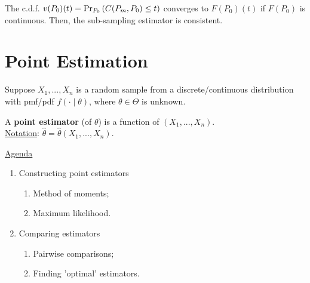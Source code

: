 \documentclass[11pt]{elegantbook}
\begin{document}
\begin{theorem}
    The c.d.f. $v(P_0)(t)=\textnormal{Pr}_{P_0}\left(C(P_m,P_0)\leq t\right)$ converges to $F(P_0)(t)$ if $F(P_0)$ is continuous. Then, the sub-sampling estimator is
    consistent.
\end{theorem}




\section{Point Estimation}
Suppose $X_1,...,X_n$ is a random sample from a discrete/continuous distribution with pmf/pdf $f(\cdot\mid \theta)$, where $\theta\in\Theta$ is unknown.

\begin{definition}
    \normalfont
    A \textbf{point estimator} (of $\theta$) is a function of $(X_1,...,X_n)$.\\
    \underline{Notation}: $\hat{\theta}=\hat{\theta}(X_1,...,X_n)$.
\end{definition}

\underline{Agenda}
\begin{enumerate}[(1).]
    \item Constructing point estimators
    \begin{enumerate}[$\circ$]
        \item Method of moments;
        \item Maximum likelihood.
    \end{enumerate}
    \item Comparing estimators
    \begin{enumerate}[$\circ$]
        \item Pairwise comparisons;
        \item Finding 'optimal' estimators.
    \end{enumerate}
\end{enumerate}
\end{document}
